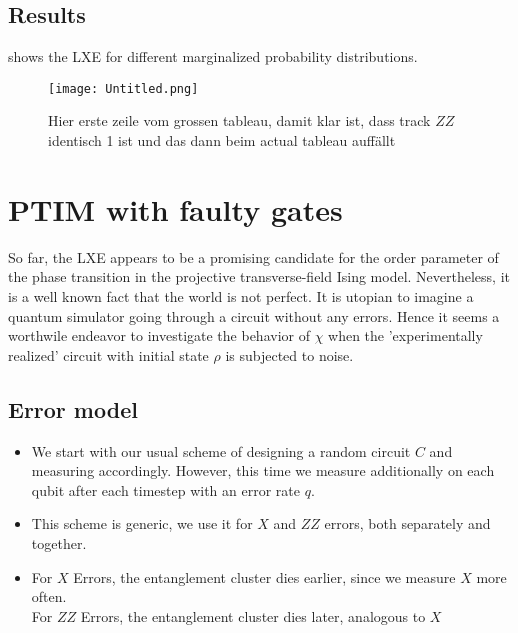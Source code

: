 \subsection{Results}

 shows the LXE for different marginalized
probability distributions.
\begin{figure}[h]
  \centering
  \texttt{[image: Untitled.png]}
  \caption{Hier erste zeile vom grossen tableau, damit klar ist, dass track
  $ZZ$ identisch 1 ist und das dann beim actual tableau auff\"allt}
  \label{fig:lxe-no-error-tracks}
\end{figure}
\section{PTIM with faulty gates}
So far, the LXE appears to be a promising candidate for the order parameter of
the phase transition in the projective transverse-field Ising model.
Nevertheless, it is a well known fact that the world is not perfect. It is
utopian to imagine a quantum simulator going through a circuit without any
errors. Hence it seems a worthwile endeavor to investigate the behavior of
$\chi$ when the 'experimentally realized' circuit with initial state $\rho$ is
subjected to noise.

\subsection{Error model}
\begin{itemize}
  \item We start with our usual scheme of designing a random circuit $C$ and
    measuring accordingly. However, this time we measure additionally on
    each qubit after each timestep with an error rate $q$.
  \item This scheme is generic, we use it for $X$ and $ZZ$ errors, both
    separately and together. 
  \item For $X$ Errors, the entanglement cluster dies earlier, since we measure
    $X$ more often.\\
    For $ZZ$ Errors, the entanglement cluster dies later, analogous to $X$\\
\end{itemize}

